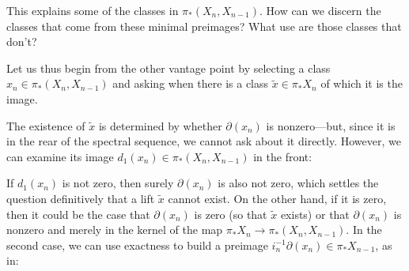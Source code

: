 This explains some of the classes in $\pi_*(X_n, X_{n-1})$.
How can we discern the classes that come from these minimal preimages?
What use are those classes that don't?

Let us thus begin from the other vantage point by selecting a class $x_n \in \pi_*(X_n, X_{n-1})$ and asking when there is a class $\widetilde x \in \pi_* X_n$ of which it is the image.

\begin{center}
\end{center}

\noindent
The existence of $\widetilde x$ is determined by whether $\partial(x_n)$ is nonzero---but, since it is in the rear of the spectral sequence, we cannot ask about it directly.
However, we can examine its image $d_1(x_n) \in \pi_*(X_n, X_{n-1})$ in the front:

\begin{center}
\end{center}

\noindent
If $d_1(x_n)$ is not zero, then surely $\partial(x_n)$ is also not zero, which settles the question definitively that a lift $\widetilde{x}$ cannot exist.
On the other hand, if it is zero, then it could be the case that $\partial(x_n)$ is zero (so that $\widetilde{x}$ exists) or that $\partial(x_n)$ is nonzero and merely in the kernel of the map $\pi_* X_n \to \pi_*(X_n, X_{n-1})$.
In the second case, we can use exactness to build a preimage $i_n^{-1} \partial(x_n) \in \pi_* X_{n-1}$, as in:

